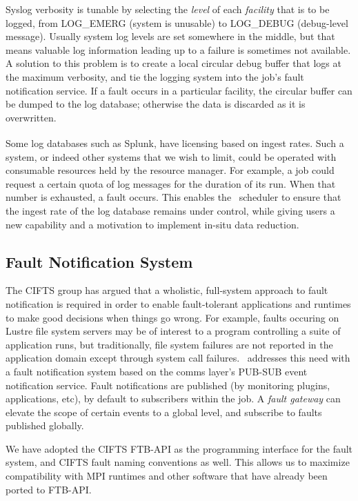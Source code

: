 Syslog verbosity is tunable by selecting the {\em level} of each
{\em facility} that is to be logged, from LOG\_EMERG (system is unusable)
to LOG\_DEBUG (debug-level message).  Usually system log levels are set
somewhere in the middle, but that means valuable log information leading
up to a failure is sometimes not available.  A solution to this problem is
to create a local circular debug buffer that logs at the maximum verbosity,
and tie the logging system into the job's fault notification service.
If a fault occurs in a particular facility, the circular buffer can be
dumped to the log database; otherwise the data is discarded as it is
overwritten.

Some log databases such as Splunk\textsuperscript{\textregistered},
have licensing based on ingest rates.  Such a system, or indeed other
systems that we wish to limit, could be operated with consumable resources
held by the resource manager.  For example, a job could request a certain
quota of log messages for the duration of its run.  When that number
is exhausted, a fault occurs.  This enables the \ngrm\ scheduler to ensure
that the ingest rate of the log database remains under control, while
giving users a new capability and a motivation to implement in-situ data
reduction.

\subsection{Fault Notification System}

The CIFTS group has argued\cite{CIFTS} that a wholistic, full-system approach
to fault notification is required in order to enable fault-tolerant
applications and runtimes to make good decisions when things go wrong.
For example, faults occuring on Lustre file system servers may be of interest
to a program controlling a suite of application runs, but traditionally,
file system failures are not reported in the application domain except
through system call failures.
\ngrm\ addresses this need with a fault notification system based on
the comms layer's PUB-SUB event notification service.  Fault notifications
are published (by monitoring plugins, applications, etc), by default
to subscribers within the job.  A {\em fault gateway} can elevate the
scope of certain events to a global level, and subscribe to faults
published globally.

We have adopted the CIFTS FTB-API as the programming interface for the
fault system, and CIFTS fault naming conventions as well.  This allows
us to maximize compatibility with MPI runtimes and other software that have
already been ported to FTB-API.

